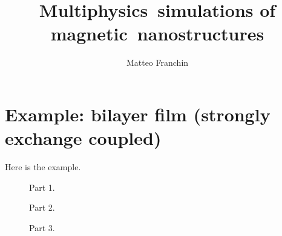 \documentclass[11pt,oneside,openany]{book}
\author{Matteo Franchin}
\title{Multiphysics~simulations of magnetic~nanostructures}
\begin{document}
\titlepage

\section{Example: bilayer film (strongly exchange coupled)}
Here is the example.

\begin{figure}[!p]

\caption{Part 1.}
\end{figure}

\begin{figure}[!p]

\caption{Part 2.}
\end{figure}

\begin{figure}[!p]

\caption{Part 3.}
\end{figure}
\end{document}
